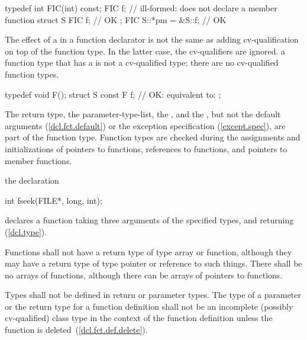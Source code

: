 \begin{codeblock}
typedef int FIC(int) const;
FIC f;              // ill-formed: does not declare a member function
struct S {
  FIC f;            // OK
};
FIC S::*pm = &S::f; // OK
\end{codeblock}
\exitexample

\pnum
The effect of a
in a function declarator is not the same as
adding cv-qualification on top of the function type.
In the latter case, the cv-qualifiers are ignored.
\enternote a function type that has a  is not a
cv-qualified type; there are no cv-qualified function types. \exitnote
\enterexample

\begin{codeblock}
typedef void F();
struct S {
  const F f;        // OK: equivalent to: 
};
\end{codeblock}
\exitexample

\pnum
The return type, the parameter-type-list, the , and the
,
but not the default arguments (\ref{dcl.fct.default})
or the exception specification (\ref{except.spec}),
are part of the function type.
\enternote
Function types are checked during the assignments and initializations of
pointers to functions, references to functions, and pointers to member functions.
\exitnote

\pnum
\enterexample
{}%
the declaration

\begin{codeblock}
int fseek(FILE*, long, int);
\end{codeblock}

declares a function taking three arguments of the specified types,
and returning
(\ref{dcl.type}).
\exitexample

\pnum
{}%
%
Functions shall not have a return type of type array or function,
although they may have a return type of type pointer or reference to such things.
There shall be no arrays of functions, although there can be arrays of pointers
to functions.

\pnum
Types shall not be defined in return or parameter types.
The type of a parameter or the return type for a function
definition shall not be an incomplete
(possibly cv-qualified) class type
in the context of the function definition
unless the function is
deleted~(\ref{dcl.fct.def.delete}).

